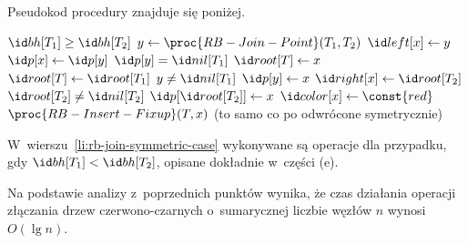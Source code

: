 \subproblem %
Pseudokod procedury  znajduje się poniżej.
\begin{codebox}
\li	\If $\attrib{T_1}{bh}\ge\attrib{T_2}{bh}$
\li		\Then $y\gets\proc{RB-Join-Point}(T_1,T_2)$
\li			$\attrib{x}{left}\gets y$
\li			$\attrib{x}{p}\gets\attrib{y}{p}$
\li			\If $\attrib{y}{p}=\attrib{T_1}{nil}$
\li				\Then $\attrib{T}{root}\gets x$
\li				\Else $\attrib{T}{root}\gets\attrib{T_1}{root}$
				\End
\li			\If $y\ne\attrib{T_1}{nil}$
\li				\Then $\attrib{y}{p}\gets x$
				\End
\li			$\attrib{x}{right}\gets\attrib{T_2}{root}$
\li			\If $\attrib{T_2}{root}\ne\attrib{T_2}{nil}$
\li				\Then $\attribb{T_2}{root}{p}\gets x$
				\End
\li			$\attrib{x}{color}\gets\const{red}$
\li			$\proc{RB-Insert-Fixup}(T,x)$
\li		\Else (to samo co po  odwrócone symetrycznie) \label{li:rb-join-symmetric-case}
		\End
\end{codebox}
W~wierszu~\ref{li:rb-join-symmetric-case} wykonywane są operacje dla przypadku, gdy $\attrib{T_1}{bh}<\attrib{T_2}{bh}$, opisane dokładnie w~części (e).

Na podstawie analizy z~poprzednich punktów wynika, że czas działania operacji złączania drzew czerwono-czarnych o~sumarycznej liczbie węzłów $n$ wynosi $O(\lg n)$.
